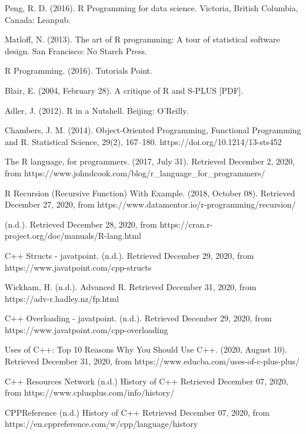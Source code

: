 \documentclass[12pt]{article}
\begin{document}
\newpage
\begin{thebibliography}{50}

Peng, R. D. (2016). R Programming for data science. Victoria, British Columbia, Canada: Leanpub.

Matloff, N. (2013). The art of R programming: A tour of statistical software design. San Francisco: No Starch Press.

R Programming. (2016). Tutorials Point.

Blair, E. (2004, February 28). A critique of R and S-PLUS [PDF].

Adler, J. (2012). R in a Nutshell. Beijing: O'Reilly.

Chambers, J. M. (2014). Object-Oriented Programming, Functional Programming and R. Statistical Science, 29(2), 167–180. https://doi.org/10.1214/13-sts452

The R language, for programmers. (2017, July 31). Retrieved December 2, 2020, from https://www.johndcook.com/blog/r\_language\_for\_programmers/

R Recursion (Recursive Function) With Example. (2018, October 08). Retrieved December 27, 2020, from https://www.datamentor.io/r-programming/recursion/

(n.d.). Retrieved December 28, 2020, from https://cran.r-project.org/doc/manuals/R-lang.html

C++ Structs - javatpoint. (n.d.). Retrieved December 29, 2020, from https://www.javatpoint.com/cpp-structs

Wickham, H. (n.d.). Advanced R. Retrieved December 31, 2020, from https://adv-r.hadley.nz/fp.html

C++ Overloading - javatpoint. (n.d.). Retrieved December 29, 2020, from https://www.javatpoint.com/cpp-overloading

Uses of C++: Top 10 Reasons Why You Should Use C++. (2020, August 10). Retrieved December 31, 2020, from https://www.educba.com/uses-of-c-plus-plus/

C++ Resources Network (n.d.) History of C++ Retrieved December 07, 2020, from https://www.cplusplus.com/info/history/

CPPReference (n.d.) History of C++ Retrieved December 07, 2020, from https://en.cppreference.com/w/cpp/language/history


\end{thebibliography}
\end{document}
